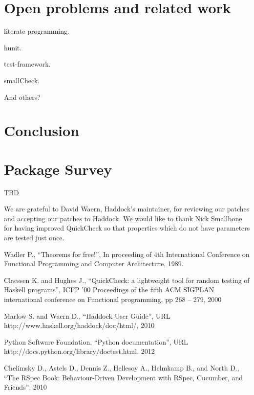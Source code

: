 \documentclass[preprint]{sigplanconf}
\begin{document}
\section{Open problems and related work}

literate programming.

hunit.

test-framework.

smallCheck.

And others?

\section{Conclusion}

\appendix

\section{Package Survey}

TBD

\acks

We are grateful to David Waern, Haddock's maintainer, for reviewing our patches
and accepting our patches to Haddock.
We would like to thank
Nick Smallbone for having improved QuickCheck so that 
properties which do not have parameters are tested just once.





\begin{thebibliography}{}
\softraggedright

Wadler P.,
``Theorems for free!'',
In proceeding of 4th International Conference on Functional Programming and Computer Architecture, 1989.

Claessen K. and Hughes J.,
``QuickCheck: a lightweight tool for random testing of Haskell programs'',
ICFP '00 Proceedings of the fifth ACM SIGPLAN international conference on Functional programming,
pp 268 -- 279,
2000

Marlow S. and Waern D.,
``Haddock User Guide'',
URL http://www.haskell.org/haddock/doc/html/,
2010

Python Software Foundation,
``Python documentation'',
URL http://docs.python.org/library/doctest.html,
2012

Chelimsky D.,
Astels D., Dennis Z., Hellesoy A., Helmkamp B., and North D.,
``The RSpec Book: Behaviour-Driven
Development with RSpec, Cucumber, and Friends'',
2010

\end{thebibliography}
\end{document}

